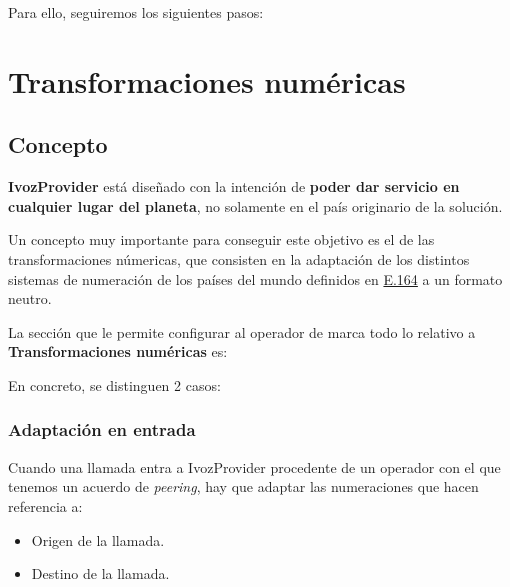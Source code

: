 \documentclass[letterpaper,10pt,spanish]{sphinxmanual}
\begin{document}
Para ello, seguiremos los siguientes pasos:


\section{Transformaciones numéricas}
\label{external_incoming_calls/numeric_transformations:transformaciones-numericas}\label{external_incoming_calls/numeric_transformations::doc}\label{external_incoming_calls/numeric_transformations:numeric-transformations}

\subsection{Concepto}
\label{external_incoming_calls/numeric_transformations:concepto}
\textbf{IvozProvider} está diseñado con la intención de \textbf{poder dar servicio en cualquier lugar del planeta}, no solamente en el país originario de la solución.

Un concepto muy importante para conseguir este objetivo es el de las transformaciones númericas, que consisten en la adaptación de los distintos sistemas de numeración de los países del mundo definidos en \href{https://www.itu.int/rec/T-REC-E.164/es}{E.164} a un formato neutro.

La sección que le permite configurar al operador de marca todo lo relativo a \textbf{Transformaciones numéricas} es:


En concreto, se distinguen 2 casos:


\subsubsection{Adaptación en entrada}
\label{external_incoming_calls/numeric_transformations:adaptacion-en-entrada}
Cuando una llamada entra a IvozProvider procedente de un operador con el que tenemos un acuerdo de \emph{peering}, hay que adaptar las numeraciones que hacen referencia a:
\begin{itemize}
\item {} 
Origen de la llamada.

\item {} 
Destino de la llamada.

\end{itemize}
\end{document}
